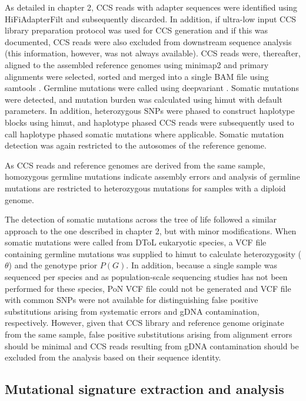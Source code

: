 As detailed in chapter 2, CCS reads with adapter sequences were identified using HiFiAdapterFilt \cite{} and subsequently discarded. In addition, if ultra-low input CCS library preparation protocol was used for CCS generation and if this was documented, CCS reads were also excluded from downstream sequence analysis (this information, however, was not always available). CCS reads were, thereafter, aligned to the assembled reference genomes using minimap2 \cite{} and primary alignments were selected, sorted and merged into a single BAM file using samtools \cite{}. Germline mutations were called using deepvariant \cite{}. Somatic mutations were detected, and mutation burden was calculated using himut with default parameters. In addition, heterozygous SNPs were phased to construct haplotype blocks using himut, and haplotype phased CCS reads were subsequently used to call haplotype phased somatic mutations where applicable. Somatic mutation detection was again restricted to the autosomes of the reference genome. 

As CCS reads and reference genomes are derived from the same sample, homozygous germline mutations indicate assembly errors and analysis of germline mutations are restricted to heterozygous mutations for samples with a diploid genome.

The detection of somatic mutations across the tree of life followed a similar approach to the one described in chapter 2, but with minor modifications. When somatic mutations were called from DToL eukaryotic species, a VCF file containing germline mutations was supplied to himut to calculate heterozygosity ($\theta$) and the genotype prior $P(G)$. In addition, because a single sample was sequenced per species and as population-scale sequencing studies has not been performed for these species, PoN VCF file could not be generated and VCF file with common SNPs were not available for distinguishing false positive substitutions arising from systematic errors and gDNA contamination, respectively. However, given that CCS library and reference genome originate from the same sample, false positive substitutions arising from alignment errors should be minimal and CCS reads resulting from gDNA contamination should be excluded from the analysis based on their sequence identity.

\subsection{Mutational signature extraction and analysis}

